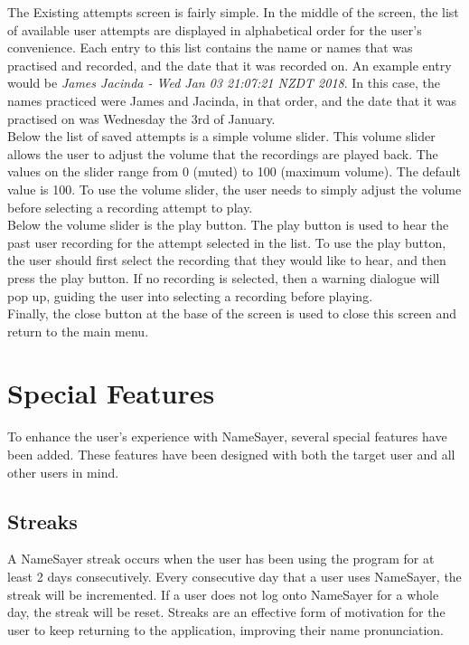 \documentclass{article}
\begin{document}
The Existing attempts screen is fairly simple. In the middle of the screen, the
list of available user attempts are displayed in alphabetical order for the
user's convenience. Each entry to this list contains the name or names that was
practised and recorded, and the date that it was recorded on. An example entry
would be {\em James Jacinda - Wed Jan 03 21:07:21 NZDT 2018}. In this case, the
names practiced were James and Jacinda, in that order, and the date that it was
practised on was Wednesday the 3rd of January. \\

Below the list of saved attempts is a simple volume slider. This volume slider
allows the user to adjust the volume that the  recordings are played back. The
values on the slider range from 0 (muted) to 100 (maximum volume). The default
value is 100. To use the  volume slider, the user needs to simply adjust the
volume before selecting a recording attempt to play. \\

Below the volume slider is the play button. The play button is used to hear the
past user recording for the attempt selected in the list. To use the play
button, the user should first select the recording that they would like to hear,
and then press the play button. If no recording is selected, then a warning
dialogue will pop up, guiding the user into selecting a recording  before
playing. \\

Finally, the close button at the base of the screen is used to close this screen
and return to the main menu.

\section{Special Features}
To enhance the user's experience with NameSayer, several special features have
been added. These features have been designed with both the target user and all
other users in mind.

\subsection{Streaks}
A NameSayer streak occurs when the user has been using the program for at least
2 days consecutively. Every consecutive day  that a user uses NameSayer, the
streak will be incremented. If a user does not log onto NameSayer for a whole
day, the  streak will be reset. Streaks are an effective form of motivation for
the user to keep returning to the application,  improving their name
pronunciation. \\
\end{document}
